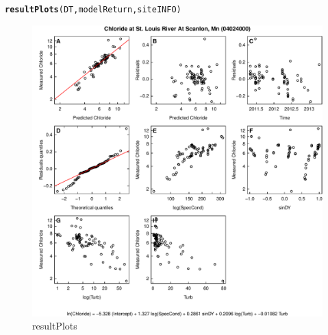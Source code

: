 \documentclass[a4paper,11pt]{article}\usepackage[]{graphicx}\usepackage[]{color}
\makeatletter
\def\maxwidth{ %
  \ifdim\Gin@nat@width>\linewidth
    \linewidth
  \else
    \Gin@nat@width
  \fi
}
\newcommand{\hlstd}[1]{\textcolor[rgb]{0.345,0.345,0.345}{#1}}%
\newcommand{\hlkwd}[1]{\textcolor[rgb]{0.737,0.353,0.396}{\textbf{#1}}}%
\newenvironment{kframe}{%
 \def\at@end@of@kframe{}%
 \ifinner\ifhmode%
  \def\at@end@of@kframe{\end{minipage}}%
  \begin{minipage}{\columnwidth}%
 \fi\fi%
 \def\FrameCommand##1{\hskip\@totalleftmargin \hskip-\fboxsep
 \colorbox{shadecolor}{##1}\hskip-\fboxsep
     \hskip-\linewidth \hskip-\@totalleftmargin \hskip\columnwidth}%
 \MakeFramed {\advance\hsize-\width
   \@totalleftmargin\z@ \linewidth\hsize
   \@setminipage}}%
 {\par\unskip\endMakeFramed%
 \at@end@of@kframe}
\newenvironment{knitrout}{}{} %
\makeatother
\begin{document}
\begin{knitrout}
\color{fgcolor}\begin{kframe}
\begin{alltt}
\hlkwd{resultPlots}\hlstd{(DT,modelReturn,siteINFO)}
\end{alltt}
\end{kframe}\begin{figure}[]

\includegraphics[width=\maxwidth]{figure/resultPlots} \caption[resultPlots]{resultPlots\label{fig:resultPlots}}
\end{figure}


\end{knitrout}


\FloatBarrier
\end{document}
